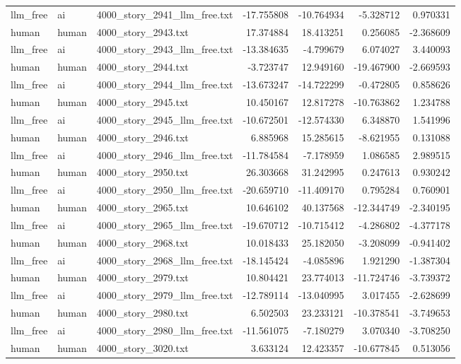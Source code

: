 \begin{longtable}{lllrrrr}
llm\_free & ai & 4000\_story\_2941\_llm\_free.txt & -17.755808 & -10.764934 & -5.328712 & 0.970331 \\
human & human & 4000\_story\_2943.txt & 17.374884 & 18.413251 & 0.256085 & -2.368609 \\
llm\_free & ai & 4000\_story\_2943\_llm\_free.txt & -13.384635 & -4.799679 & 6.074027 & 3.440093 \\
human & human & 4000\_story\_2944.txt & -3.723747 & 12.949160 & -19.467900 & -2.669593 \\
llm\_free & ai & 4000\_story\_2944\_llm\_free.txt & -13.673247 & -14.722299 & -0.472805 & 0.858626 \\
human & human & 4000\_story\_2945.txt & 10.450167 & 12.817278 & -10.763862 & 1.234788 \\
llm\_free & ai & 4000\_story\_2945\_llm\_free.txt & -10.672501 & -12.574330 & 6.348870 & 1.541996 \\
human & human & 4000\_story\_2946.txt & 6.885968 & 15.285615 & -8.621955 & 0.131088 \\
llm\_free & ai & 4000\_story\_2946\_llm\_free.txt & -11.784584 & -7.178959 & 1.086585 & 2.989515 \\
human & human & 4000\_story\_2950.txt & 26.303668 & 31.242995 & 0.247613 & 0.930242 \\
llm\_free & ai & 4000\_story\_2950\_llm\_free.txt & -20.659710 & -11.409170 & 0.795284 & 0.760901 \\
human & human & 4000\_story\_2965.txt & 10.646102 & 40.137568 & -12.344749 & -2.340195 \\
llm\_free & ai & 4000\_story\_2965\_llm\_free.txt & -19.670712 & -10.715412 & -4.286802 & -4.377178 \\
human & human & 4000\_story\_2968.txt & 10.018433 & 25.182050 & -3.208099 & -0.941402 \\
llm\_free & ai & 4000\_story\_2968\_llm\_free.txt & -18.145424 & -4.085896 & 1.921290 & -1.387304 \\
human & human & 4000\_story\_2979.txt & 10.804421 & 23.774013 & -11.724746 & -3.739372 \\
llm\_free & ai & 4000\_story\_2979\_llm\_free.txt & -12.789114 & -13.040995 & 3.017455 & -2.628699 \\
human & human & 4000\_story\_2980.txt & 6.502503 & 23.233121 & -10.378541 & -3.749653 \\
llm\_free & ai & 4000\_story\_2980\_llm\_free.txt & -11.561075 & -7.180279 & 3.070340 & -3.708250 \\
human & human & 4000\_story\_3020.txt & 3.633124 & 12.423357 & -10.677845 & 0.513056 \\

\end{longtable}
